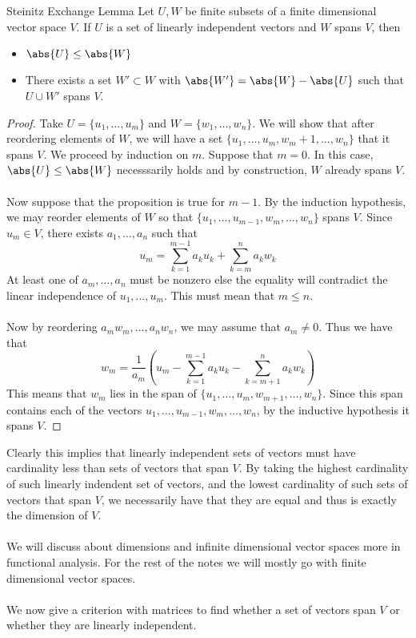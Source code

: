 \begin{thm}{Steinitz Exchange Lemma}{} Let $U,W$ be finite subsets of a finite dimensional vector space $V$. If $U$ is a set of linearly independent vectors and $W$ spans $V$, then 
\begin{itemize}
\item $\abs{U}\leq\abs{W}$
\item There exists a set $W'\subset W$ with $\abs{W'}=\abs{W}-\abs{U}$ such that $U\cup W'$ spans $V$. 
\end{itemize} \tcbline
\begin{proof}
Take $U=\{u_1,\dots,u_m\}$ and $W=\{w_1,\dots,w_n\}$. We will show that after reordering elements of $W$, we will have a set $\{u_1,\dots,u_m,w_m+1,\dots,w_n\}$ that it spans $V$. We proceed by induction on $m$. Suppose that $m=0$. In this case, $\abs{U}\leq\abs{W}$ necesssarily holds and by construction, $W$ already spans $V$. \\~\\
Now suppose that the proposition is true for $m-1$. By the induction hypothesis, we may reorder elements of $W$ so that $\{u_1,\dots,u_{m-1},w_m,\dots,w_n\}$ spans $V$. Since $u_m\in V$, there exists $a_1,\dots,a_n$ such that $$u_m=\sum_{k=1}^{m-1}a_ku_k+\sum_{k=m}^na_kw_k$$ At least one of $a_m,\dots,a_n$ must be nonzero else the equality will contradict the linear independence of $u_1,\dots,u_m$. This must mean that $m\leq n$. \\~\\
Now by reordering $a_mw_m,\dots,a_nw_n$, we may assume that $a_m\neq 0$. Thus we have that $$w_m=\frac{1}{a_m}\left(u_m-\sum_{k=1}^{m-1}a_ku_k-\sum_{k=m+1}^na_kw_k\right)$$ This means that $w_m$ lies in the span of $\{u_1,\dots,u_m,w_{m+1},\dots,w_n\}$. Since this span contains each of the vectors $u_1,\dots,u_{m-1},w_m,\dots,w_n$, by the inductive hypothesis it spans $V$. 
\end{proof}
\end{thm}

Clearly this implies that linearly independent sets of vectors must have cardinality less than sets of vectors that span $V$. By taking the highest cardinality of such linearly indendent set of vectors, and the lowest cardinality of such sets of vectors that span $V$, we necessarily have that they are equal and thus is exactly the dimension of $V$. \\~\\

We will discuss about dimensions and infinite dimensional vector spaces more in functional analysis. For the rest of the notes we will mostly go with finite dimensional vector spaces. \\~\\
We now give a criterion with matrices to find whether a set of vectors span $V$ or whether they are linearly independent. 

